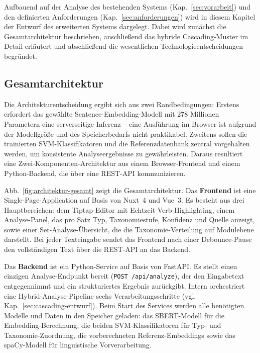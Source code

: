 
Aufbauend auf der Analyse des bestehenden Systems (Kap.~\ref{sec:vorarbeit}) und den definierten Anforderungen (Kap.~\ref{sec:anforderungen}) wird in diesem Kapitel der Entwurf des erweiterten Systems dargelegt.
Dabei wird zunächst die Gesamtarchitektur beschrieben, anschließend das hybride Cascading-Muster im Detail erläutert und abschließend die wesentlichen Technologieentscheidungen begründet.

\subsection{Gesamtarchitektur}\label{sec:architektur}

Die Architekturentscheidung ergibt sich aus zwei Randbedingungen: Erstens erfordert das gewählte Sentence-Embedding-Modell mit 278 Millionen Parametern eine serverseitige Inferenz -- eine Ausführung im Browser ist aufgrund der Modellgröße und des Speicherbedarfs nicht praktikabel.
Zweitens sollen die trainierten SVM-Klassifikatoren und die Referenzdatenbank zentral vorgehalten werden, um konsistente Analyseergebnisse zu gewährleisten.
Daraus resultiert eine Zwei-Komponenten-Architektur aus einem Browser-Frontend und einem Python-Backend, die über eine REST-API kommunizieren.

Abb.~\ref{fig:architektur-gesamt} zeigt die Gesamtarchitektur.
Das \textbf{Frontend} ist eine Single-Page-Application auf Basis von Nuxt~4 und Vue~3.
Es besteht aus drei Hauptbereichen: dem Tiptap-Editor mit Echtzeit-Verb-Highlighting, einem Analyse-Panel, das pro Satz Typ, Taxonomiestufe, Konfidenz und Quelle anzeigt, sowie einer Set-Analyse-Übersicht, die die Taxonomie-Verteilung auf Modulebene darstellt.
Bei jeder Texteingabe sendet das Frontend nach einer Debounce-Pause den vollständigen Text über die REST-API an das Backend.

Das \textbf{Backend} ist ein Python-Service auf Basis von FastAPI.
Es stellt einen einzigen Analyse-Endpunkt bereit (\texttt{POST /api/analyze}), der den Eingabetext entgegennimmt und ein strukturiertes Ergebnis zurückgibt.
Intern orchestriert eine Hybrid-Analyse-Pipeline sechs Verarbeitungsschritte (vgl. Kap.~\ref{sec:cascading-entwurf}).
Beim Start des Services werden alle benötigten Modelle und Daten in den Speicher geladen: das SBERT-Modell für die Embedding-Berechnung, die beiden SVM-Klassifikatoren für Typ- und Taxonomie-Zuordnung, die vorberechneten Referenz-Embeddings sowie das spaCy-Modell für linguistische Vorverarbeitung.

